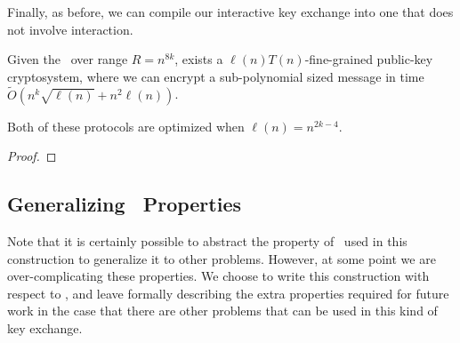 Finally, as before, we can compile our interactive key exchange into one that does not involve interaction.
\begin{corollary}
	Given the \strongzkc~over range $R = n^{8k}$, exists a $\ell(n)T(n)$-fine-grained public-key cryptosystem, where we can encrypt a sub-polynomial sized message in time $\tilde{O}\left(n^{k}\sqrt{\ell(n)} + n^2\ell(n)\right)$.
	
	Both of these protocols are optimized when $\ell(n) = n^{2k-4}$.
	\label{cor:n2-pkc}
\end{corollary}
\begin{proof}
	
\end{proof}

\subsection{Generalizing \zkclique~Properties}
Note that it is certainly possible to abstract the property of \zkclique~used in this construction to generalize it to other problems. However, at some point we are over-complicating these properties. We choose to write this construction with respect to \zkclique, and leave formally describing the extra properties required for future work in the case that there are other problems that can be used in this kind of key exchange.